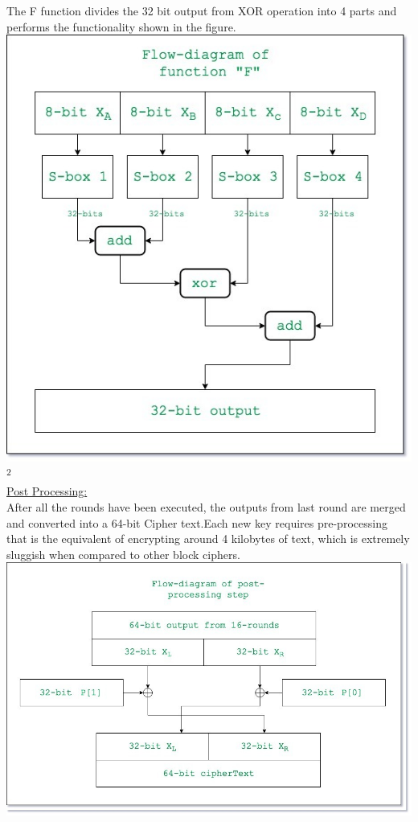 \documentclass[a4paper]{report} %
\begin{document}
The F function divides the 32 bit output from XOR operation into 4 parts and performs the functionality shown in the figure. \\
\includegraphics[scale=0.5]{Flow.jpg}\textsuperscript{2}\\
\underline{Post Processing:}\\
After all the rounds have been executed, the outputs from last round are merged and converted into a 64-bit Cipher text.Each new key requires pre-processing that is the equivalent of encrypting around 4 kilobytes of text, which is extremely sluggish when compared to other block ciphers.\\
\includegraphics[scale=0.5]{ppr.jpg}\\
\end{document}

